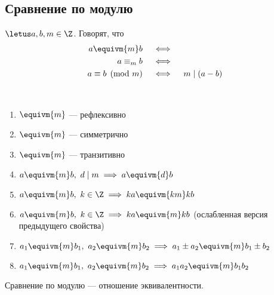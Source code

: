 \subsection{Сравнение по модулю}

\begin{defn}
    $\letus a, b, m \in \Z$. Говорят, что
    \begin{align*}
        a \equivm{m} b &\quad\iff \\
        a \equiv_m b &\quad\iff \\
        a \equiv b \pmod{m} &\quad\iff\quad m \mid (a - b)
    \end{align*}
\end{defn}

\begin{prop}~
    \begin{enumerate}
        \item $\equivm{m}$ --- рефлексивно
    
        \item $\equivm{m}$ --- симметрично
    
        \item $\equivm{m}$ --- транзитивно
    
        \item $a \equivm{m} b,~d \mid m \implies a \equivm{d} b$
    
        \item $a \equivm{m} b,~k \in \Z \implies ka \equivm{km} kb$

        \item $a \equivm{m} b,~k \in \Z \implies ka \equivm{m} kb$ (ослабленная версия предыдущего свойства)
    
        \item $a_1 \equivm{m} b_1,~a_2 \equivm{m} b_2 \implies a_1 \pm a_2 \equivm{m} b_1 \pm b_2$
    
        \item $a_1 \equivm{m} b_1,~a_2 \equivm{m} b_2 \implies a_1 a_2 \equivm{m} b_1 b_2$
    \end{enumerate}
\end{prop}

\begin{notice}
    Сравнение по модулю --- отношение эквивалентности.    
\end{notice}
